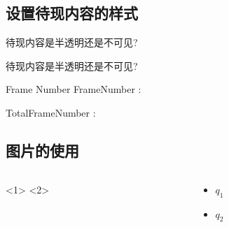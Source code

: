 \documentclass{beamer}
\begin{document}
\subsection{设置待现内容的样式}
\begin{frame}
 \begin{block}{待现内容是半透明还是不可见?}
 \end{block}
\end{frame}
\begin{frame}
 \begin{block}{待现内容是半透明还是不可见?}
 \end{block}
\end{frame}
\begin{frame}{Frame Number}
 \text{} {} {} {} {} {} {} FrameNumber :\insertframenumber

 TotalFrameNumber :\inserttotalframenumber
\end{frame}
\subsection{图片的使用}
\begin{frame}
 \begin{columns}%
  \begin{column}{5cm}
   <1>
   <2>
  \end{column}
  \begin{column}{2cm}
   \begin{itemize}
    \item <1-|alert@1>$q_1$
    \item <2-|alert@2>$q_2$
   \end{itemize}
  \end{column}
 \end{columns}
\end{frame}
\end{document}
